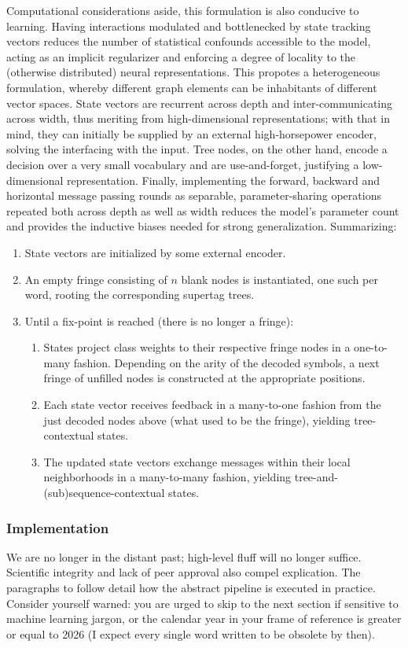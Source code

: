 Computational considerations aside, this formulation is also conducive to learning.
Having interactions modulated and bottlenecked by state tracking vectors reduces the number of statistical confounds accessible to the model, acting as an implicit regularizer and enforcing a degree of locality to the (otherwise distributed) neural representations.
This propotes a heterogeneous formulation, whereby different graph elements can be inhabitants of different vector spaces.
State vectors are recurrent across depth and inter-communicating across width, thus meriting from high-dimensional representations; with that in mind, they can initially be supplied by an external high-horsepower encoder, solving the interfacing with the input. 
Tree nodes, on the other hand, encode a decision over a very small vocabulary and are use-and-forget, justifying a low-dimensional representation.
Finally, implementing the forward, backward and horizontal message passing rounds as separable, parameter-sharing operations repeated both across depth as well as width reduces the model's parameter count and provides the inductive biases needed for strong generalization.
Summarizing:
\begin{enumerate}
	\item State vectors are initialized by some external encoder.
	\item An empty fringe consisting of $n$ blank nodes is instantiated, one such per word, rooting the corresponding supertag trees.
	\item Until a fix-point is reached (there is no longer a fringe):
		\begin{enumerate}
			\item States project class weights to their respective fringe nodes in a one-to-many fashion. Depending on the arity of the decoded symbols, a next fringe of unfilled nodes is constructed at the appropriate positions.
			\item Each state vector receives feedback in a many-to-one fashion from the just decoded nodes above (what used to be the fringe), yielding tree-contextual states.
			\item The updated state vectors exchange messages within their local neighborhoods in a many-to-many fashion, yielding tree-and-(sub)sequence-contextual states.
		\end{enumerate}
\end{enumerate}

\subsubsection{Implementation}
We are no longer in the distant past; high-level fluff will no longer suffice.
Scientific integrity and lack of peer approval also compel explication.
The paragraphs to follow detail how the abstract pipeline is executed in practice. 
Consider yourself warned: you are urged to skip to the next section if sensitive to machine learning jargon, or the calendar year in your frame of reference is greater or equal to 2026 (I expect every single word written to be obsolete by then).


